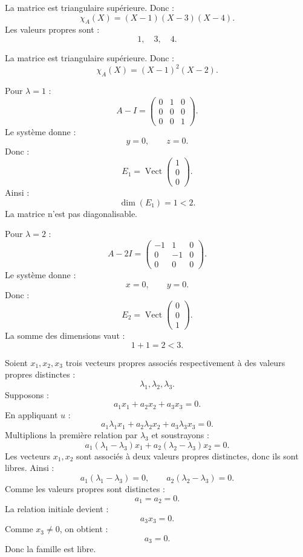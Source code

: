 \documentclass[11pt,a4paper]{article}
\newcommand{\Vect}{\operatorname{Vect}}
\begin{document}
\begin{correctionbox}[4]
La matrice est triangulaire supérieure.  
Donc :
\[
\chi_A(X)=(X-1)(X-3)(X-4).
\]
Les valeurs propres sont :
\[
1,\quad3,\quad4.
\]
\end{correctionbox}

\begin{correctionbox}[5]
La matrice est triangulaire supérieure.  
Donc :
\[
\chi_A(X)=(X-1)^2(X-2).
\]

Pour \(\lambda=1\) :
\[
A-I=
\begin{pmatrix}
0&1&0\\
0&0&0\\
0&0&1
\end{pmatrix}.
\]
Le système donne :
\[
y=0,\qquad z=0.
\]
Donc :
\[
E_1=\Vect
\begin{pmatrix}
1\\0\\0
\end{pmatrix}.
\]
Ainsi :
\[
\dim(E_1)=1<2.
\]
La matrice n'est pas diagonalisable.

Pour \(\lambda=2\) :
\[
A-2I=
\begin{pmatrix}
-1&1&0\\
0&-1&0\\
0&0&0
\end{pmatrix}.
\]
Le système donne :
\[
x=0,\qquad y=0.
\]
Donc :
\[
E_2=\Vect
\begin{pmatrix}
0\\0\\1
\end{pmatrix}.
\]
La somme des dimensions vaut :
\[
1+1=2<3.
\]
\end{correctionbox}

\begin{correctionbox}[6]
Soient \(x_1,x_2,x_3\) trois vecteurs propres associés respectivement à des valeurs propres distinctes :
\[
\lambda_1,\lambda_2,\lambda_3.
\]
Supposons :
\[
a_1x_1+a_2x_2+a_3x_3=0.
\]
En appliquant \(u\) :
\[
a_1\lambda_1x_1+a_2\lambda_2x_2+a_3\lambda_3x_3=0.
\]
Multiplions la première relation par \(\lambda_3\) et soustrayons :
\[
a_1(\lambda_1-\lambda_3)x_1+a_2(\lambda_2-\lambda_3)x_2=0.
\]
Les vecteurs \(x_1,x_2\) sont associés à deux valeurs propres distinctes, donc ils sont libres.  
Ainsi :
\[
a_1(\lambda_1-\lambda_3)=0,
\qquad
a_2(\lambda_2-\lambda_3)=0.
\]
Comme les valeurs propres sont distinctes :
\[
a_1=a_2=0.
\]
La relation initiale devient :
\[
a_3x_3=0.
\]
Comme \(x_3\neq0\), on obtient :
\[
a_3=0.
\]
Donc la famille est libre.
\end{correctionbox}
\end{document}
